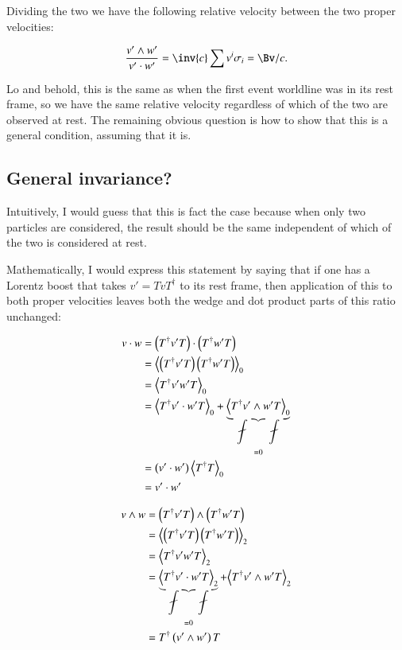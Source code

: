 Dividing the two we have the following relative velocity between the two proper velocities:

\begin{equation*}
\frac{v' \wedge w'}{v' \cdot w'} = \inv{c} \sum v^i \sigma_i = \Bv/c.
\end{equation*}

Lo and behold, this is the same as when the first event worldline was in its rest frame, so we have the same
relative velocity regardless of which of the two are observed at rest.  The remaining obvious question is 
how to show that this is a general condition, assuming that it is.

\subsection{General invariance? }

Intuitively, I would guess that this is fact the case because when only two particles are considered, the result should be the same independent of which of the
two is considered at rest.

Mathematically, I would express this statement by saying that if one has
a Lorentz boost that takes $v' = T v T^\dagger$ to its rest frame, then application of this to both proper velocities leaves both the wedge and dot product 
parts of this ratio unchanged:

\begin{align*}
v \cdot w 
&= \left(T^\dagger v' T\right) \cdot \left(T^\dagger w' T\right) \\
&= {\left\langle{{\left(T^\dagger v' T\right) \left(T^\dagger w' T\right)}}\right\rangle}_{0} \\
&= {\left\langle{{T^\dagger v' w' T}}\right\rangle}_{0} \\
&= {\left\langle{{T^\dagger v' \cdot w' T}}\right\rangle}_{0} + \underbrace{{\left\langle{{T^\dagger v' \wedge w' T}}\right\rangle}_{0}}_{=0} \\
&= \left(v' \cdot w'\right){\left\langle{{T^\dagger T}}\right\rangle}_{0} \\
&= v' \cdot w'
\end{align*}

\begin{align*}
v \wedge w 
&= \left(T^\dagger v' T\right) \wedge \left(T^\dagger w' T\right) \\
&= {\left\langle{{\left(T^\dagger v' T\right) \left(T^\dagger w' T\right)}}\right\rangle}_{2} \\
&= {\left\langle{{T^\dagger v' w' T}}\right\rangle}_{2} \\
&= \underbrace{{\left\langle{{T^\dagger v' \cdot w' T}}\right\rangle}_{2}}_{=0} + {\left\langle{{T^\dagger v' \wedge w' T}}\right\rangle}_{2} \\
&= T^\dagger \left(v' \wedge w'\right) T
\end{align*}

